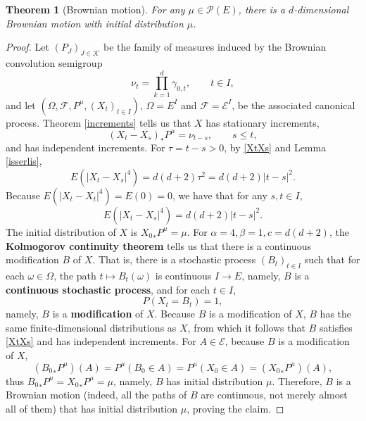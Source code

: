\documentclass{article}
\newtheorem{theorem}{Theorem}
\theoremstyle{definition}
\begin{document}
\begin{theorem}[Brownian motion]
For any $\mu \in \mathscr{P}(E)$, there is a $d$-dimensional Brownian motion with initial distribution $\mu$.
\label{brownian}
\end{theorem}
\begin{proof}
Let $(P_J)_{J \in \mathscr{K}}$ be the family of measures induced by the Brownian convolution semigroup
\[
\nu_t = \prod_{k=1}^d \gamma_{0,t}, \qquad t \in I,
\]
and let $(\Omega,\mathscr{F},P^\mu,(X_t)_{t \in I})$, $\Omega=E^I$ and $\mathscr{F}=\mathscr{E}^I$,
be the associated canonical process.
Theorem \ref{increments} tells us that $X$ has stationary increments,
\begin{equation}
(X_t-X_s)_*P^\mu = \nu_{t-s},\qquad s \leq t,
\label{XtXs}
\end{equation}
and has independent increments. 
For $\tau=t-s>0$, by \eqref{XtXs} and 
Lemma \ref{isserlis},
\[
E(|X_t-X_s|^4) = d(d+2) \tau^2 = d(d+2) |t-s|^2.
\]
Because $E(|X_t-X_t|^4)=E(0)=0$, we have that for any $s,t \in I$,
\[
E(|X_t-X_s|^4)  = d(d+2)|t-s|^2.
\]
The initial distribution of $X$ is ${X_0}_*P^\mu = \mu$.
For $\alpha=4, \beta=1, c=d(d+2)$, the \textbf{Kolmogorov continuity theorem} tells us that there is a continuous modification $B$ of $X$. That is, there is a stochastic process $(B_t)_{t \in I}$
such that for each $\omega \in \Omega$, the path $t \mapsto B_t(\omega)$ is continuous 
$I \to E$, namely, $B$ is a \textbf{continuous stochastic process}, and
for each $t \in I$, 
\[
P(X_t = B_t)=1,
\]
namely, $B$ is a \textbf{modification} of $X$. Because $B$ is a modification of $X$, $B$ has the same finite-dimensional distributions as $X$, from which it follows that $B$ satisfies \eqref{XtXs} and has independent increments. 
For $A \in \mathscr{E}$, because $B$ is a modification of $X$,
\[
({B_0}_*P^\mu)(A) = P^\mu(B_0 \in A) = P^\mu(X_0 \in A) = ({X_0}_*P^\mu)(A),
\]
thus ${B_0}_*P^\mu = {X_0}_*P^\mu = \mu$, namely, $B$ has initial distribution $\mu$.
Therefore, $B$ is a Brownian motion (indeed, all the paths of $B$ are continuous, not merely almost all of them) that has initial distribution
$\mu$, proving the claim.
\end{proof}
\end{document}
